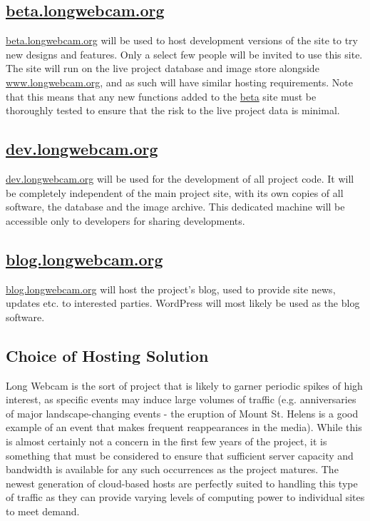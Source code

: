 \documentclass[11pt]{article}
\begin{document}
\subsection{\protect\url{beta.longwebcam.org}}
\url{beta.longwebcam.org} will be used to host development versions of the site to try new designs and features. Only a select few people will be invited to use this site. The site will run on the live project database and image store alongside \url{www.longwebcam.org}, and as such will have similar hosting requirements. Note that this means that any new functions added to the \url{beta} site must be thoroughly tested to ensure that the risk to the live project data is minimal.

\subsection{\protect\url{dev.longwebcam.org}}
\url{dev.longwebcam.org} will be used for the development of all project code. It will be completely independent of the main project site, with its own copies of all software, the database and the image archive. This dedicated machine will be accessible only to developers for sharing developments.

\subsection{\protect\url{blog.longwebcam.org}}
\url{blog.longwebcam.org} will host the project's blog, used to provide site news, updates etc. to interested parties. WordPress will most likely be used as the blog software.

\subsection{Choice of Hosting Solution}
Long Webcam is the sort of project that is likely to garner periodic spikes of high interest, as specific events may induce large volumes of traffic (e.g. anniversaries of major landscape-changing events - the eruption of Mount St. Helens is a good example of an event that makes frequent reappearances in the media). While this is almost certainly not a concern in the first few years of the project, it is something that must be considered to ensure that sufficient server capacity and bandwidth is available for any such occurrences as the project matures. The newest generation of cloud-based hosts are perfectly suited to handling this type of traffic as they can provide varying levels of computing power to individual sites to meet demand.
\end{document}
